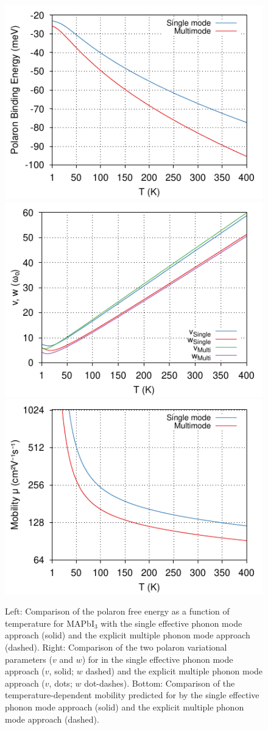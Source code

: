 \begin{figure}[!tbp]
\centering
    \includegraphics[width=.49\columnwidth]{chapters/materials/figures/MAPI-energy-temp-1to400K-COLOUR.pdf}
    \includegraphics[width=.49\columnwidth]{chapters/materials/figures/MAPI-vw-temp-1to400K-COLOUR.pdf}
    \includegraphics[width=.49\columnwidth]{chapters/materials/figures/MAPI-mobility-temp-1to400K-COLOUR.pdf}
    \caption{\label{fig:MAPIenergycomparison} Left: Comparison of the polaron free energy as a function of temperature for MAPbI$_3$ with the single effective phonon mode approach (solid) and the explicit multiple phonon mode approach (dashed). Right: Comparison of the two polaron variational parameters ($v$ and $w$) for  in the single effective phonon mode approach ($v$, solid; $w$ dashed) and the explicit multiple phonon mode approach ($v$, dots; $w$ dot-dashes). Bottom: Comparison of the temperature-dependent mobility predicted for  by the single effective phonon mode approach (solid) and the explicit multiple phonon mode approach (dashed).
}
\end{figure}

